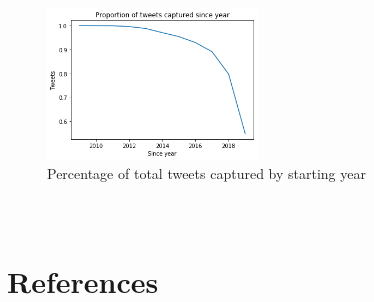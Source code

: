 \documentclass[12pt]{article}
\begin{document}
\begin{figure}[h!]
    \centering
     \includegraphics[width=0.5\textwidth]{tweets_since_year}
        \caption{Percentage of total tweets captured by starting year}
\end{figure}

\section{\\References}
\end{document}
